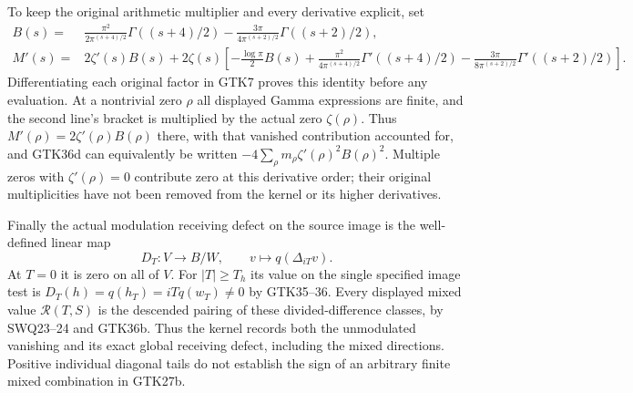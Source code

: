 To keep the original arithmetic multiplier
and every derivative explicit, set
\begin{equation}\tag{GTK36e}
 \begin{split}
 B(s)={}&\frac{\pi^2}{2\pi^{(s+4)/2}}\Gamma((s+4)/2)
       -\frac{3\pi}{4\pi^{(s+2)/2}}\Gamma((s+2)/2),\\
 M'(s)={}&2\zeta'(s)B(s)
   +2\zeta(s)\left[
       -\frac{\log\pi}{2}B(s)
       +\frac{\pi^2}{4\pi^{(s+4)/2}}\Gamma'((s+4)/2)
       -\frac{3\pi}{8\pi^{(s+2)/2}}\Gamma'((s+2)/2)
                    \right].
 \end{split}
\end{equation}
Differentiating each original factor in
GTK7 proves this identity before any
evaluation. At a nontrivial zero $\rho$
all displayed Gamma expressions are finite,
and the second line's bracket is multiplied
by the actual zero $\zeta(\rho)$. Thus
$M'(\rho)=2\zeta'(\rho)B(\rho)$ there,
with that vanished contribution accounted
for, and GTK36d can equivalently be
written $-4\sum_\rho m_\rho
\zeta'(\rho)^2B(\rho)^2$.
Multiple zeros with $\zeta'(\rho)=0$
contribute zero at this derivative order;
their original multiplicities have not
been removed from the kernel or its
higher derivatives.

Finally the actual modulation receiving
defect on the source image is the
well-defined linear map
\begin{equation}\tag{GTK36f}
 D_T:V\longrightarrow B/W,\qquad
                 v\longmapsto q(\Delta_{iT}v).
\end{equation}
At $T=0$ it is zero on all of $V$.
For $|T|\ge T_h$ its value on the single
specified image test is
$D_T(h)=q(h_T)=iTq(w_T)\ne0$ by GTK35--36.
Every displayed mixed value
$\mathcal R(T,S)$ is the descended
pairing of these divided-difference
classes, by SWQ23--24 and GTK36b.
Thus the kernel records both the
unmodulated vanishing and its exact
global receiving defect, including the
mixed directions. Positive individual
diagonal tails do not establish the
sign of an arbitrary finite mixed
combination in GTK27b.

